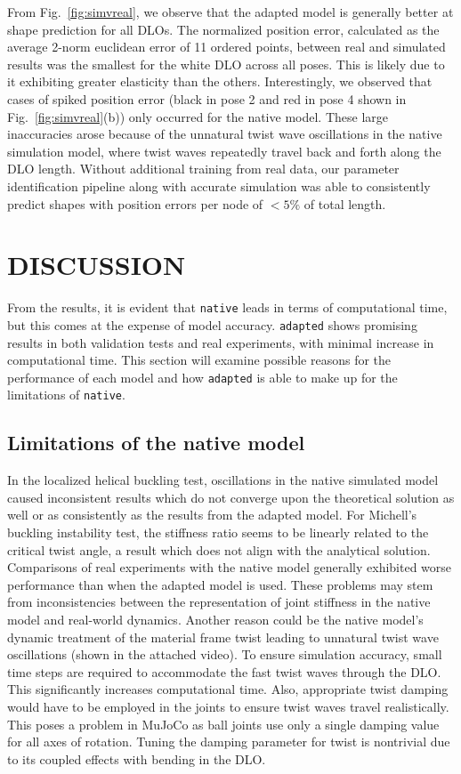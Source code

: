 \documentclass[letterpaper, 10 pt, conference]{ieeeconf}  %
\begin{document}
From Fig.~\ref{fig:simvreal}, we observe that the adapted model is generally better at shape prediction for all DLOs. The normalized position error, calculated as the average 2-norm euclidean error of 11 ordered points, between real and simulated results was the smallest for the white DLO across all poses. This is likely due to it exhibiting greater elasticity than the others. Interestingly, we observed that cases of spiked position error (black in pose 2 and red in pose 4 shown in Fig.~\ref{fig:simvreal}(b)) only occurred for the native model. These large inaccuracies arose because of the unnatural twist wave oscillations in the native simulation model, where twist waves repeatedly travel back and forth along the DLO length. Without additional training from real data, our parameter identification pipeline along with accurate simulation was able to consistently predict shapes with position errors per node of $<5\%$ of total length.

\section{DISCUSSION}
\label{section:eval}
From the results, it is evident that \verb!native! leads in terms of computational time, but this comes at the expense of model accuracy. \verb!adapted! shows promising results in both validation tests and real experiments, with minimal increase in computational time. This section will examine possible reasons for the performance of each model and how \verb!adapted! is able to make up for the limitations of \verb!native!.

\subsection{Limitations of the native model}
In the localized helical buckling test, oscillations in the native simulated model caused inconsistent results which do not converge upon the theoretical solution as well or as consistently as the results from the adapted model. For Michell's buckling instability test, the stiffness ratio seems to be linearly related to the critical twist angle, a result which does not align with the analytical solution. Comparisons of real experiments with the native model generally exhibited worse performance than when the adapted model is used. These problems may stem from inconsistencies between the representation of joint stiffness in the native model and real-world dynamics. Another reason could be the native model's dynamic treatment of the material frame twist leading to unnatural twist wave oscillations (shown in the attached video). To ensure simulation accuracy, small time steps are required to accommodate the fast twist waves through the DLO. This significantly increases computational time. Also, appropriate twist damping would have to be employed in the joints to ensure twist waves travel realistically. This poses a problem in MuJoCo as ball joints use only a single damping value for all axes of rotation. Tuning the damping parameter for twist is nontrivial due to its coupled effects with bending in the DLO.
\end{document}
